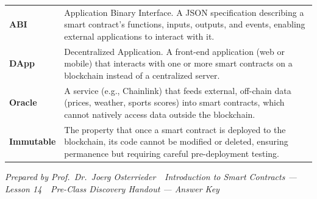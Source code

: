 \documentclass[11pt,a4paper]{article}
\begin{document}
\begin{tabular}{@{}p{3.6cm}p{11.0cm}@{}}
\textbf{ABI}              & Application Binary Interface. A JSON specification describing a smart contract's functions, inputs, outputs, and events, enabling external applications to interact with it. \\
\textbf{DApp}             & Decentralized Application. A front-end application (web or mobile) that interacts with one or more smart contracts on a blockchain instead of a centralized server. \\
\textbf{Oracle}           & A service (e.g., Chainlink) that feeds external, off-chain data (prices, weather, sports scores) into smart contracts, which cannot natively access data outside the blockchain. \\
\textbf{Immutable}        & The property that once a smart contract is deployed to the blockchain, its code cannot be modified or deleted, ensuring permanence but requiring careful pre-deployment testing. \\
\bottomrule
\end{tabular}

\vspace{6pt}
\noindent\textcolor{mlgray}{\small\textit{Prepared by Prof.\ Dr.\ Joerg Osterrieder \,\textbullet\, Introduction to Smart Contracts --- Lesson 14 \,\textbullet\, Pre-Class Discovery Handout --- Answer Key}}
\end{document}
